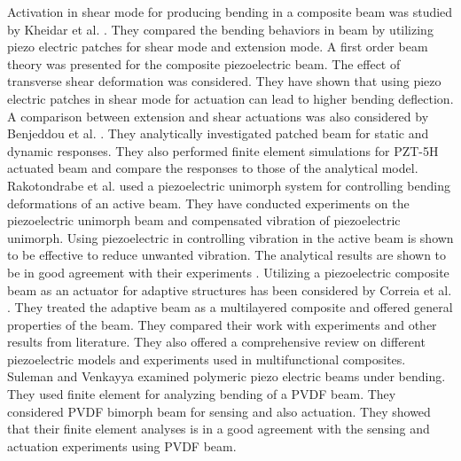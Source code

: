 Activation in shear mode for producing bending in a composite beam was studied by Kheidar et al. \cite{khdeir2001deflection}.
They compared the bending behaviors in beam by utilizing piezo electric patches for shear mode and extension mode.  
A first order beam theory was presented for the composite piezoelectric beam. 
The effect of transverse shear deformation was considered.
They have shown that using piezo electric patches in shear mode for actuation can lead to higher bending deflection. 
A comparison between extension and shear actuations was also considered by Benjeddou et al. \cite{benjeddou1999new}.
They analytically investigated patched beam for static and dynamic responses.
They also performed finite element simulations for PZT-5H actuated beam and compare the responses to those of the analytical model. 
Rakotondrabe et al. \cite{rakotondrabe2006plurilinear} used a piezoelectric unimorph system for controlling bending deformations of an active beam.
They have conducted experiments on the piezoelectric unimorph beam and compensated vibration of piezoelectric unimorph.
Using piezoelectric in controlling vibration in the active beam is shown to be effective to reduce unwanted vibration.
The analytical results are shown to be in good agreement with their experiments \cite{rakotondrabe2008hysteresis}.  
Utilizing a piezoelectric composite beam as an actuator for adaptive structures has been considered by Correia et al. \cite{franco2000modelling}.
They treated the adaptive beam as a multilayered composite and offered general properties of the beam.
They compared their work with experiments and other results from literature.
They also offered a comprehensive review on different piezoelectric models and experiments used in multifunctional composites.
Suleman and Venkayya \cite{suleman1995simple} examined polymeric piezo electric beams under bending. 
They used finite element for analyzing bending of a PVDF beam.
They considered PVDF bimorph beam for sensing and also actuation.
They showed that their finite element analyses is in a good agreement with the sensing and actuation experiments using PVDF beam. \\
  

